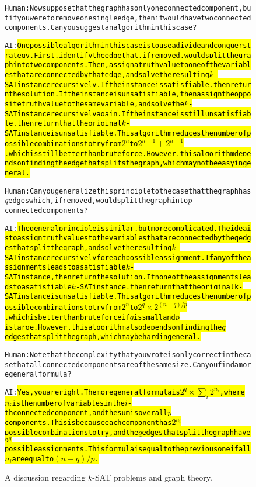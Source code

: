 \begin{figure}[H]
\begin{AIbox}{\DV}
{\begin{alltt}
Human: Now suppose that the graph has only one connected component, but if you were to remove one single edge, then it would have two connected components. Can you suggest an algorithm in this case?

AI: \hl{One possible algorithm in this case is to use a divide and conquer strategy. First, identify the edge that, if removed, would split the graph into two components. Then, assign a truth value to one of the variables that are connected by that edge, and solve the resulting $k$-SAT instance recursively. If the instance is satisfiable, then return the solution. If the instance is unsatisfiable, then assign the opposite truth value to the same variable, and solve the $k$-SAT instance recursively again. If the instance is still unsatisfiable, then return that the original $k$-SAT instance is unsatisfiable. This algorithm reduces the number of possible combinations to try from $2^n$ to $2^{n-1} + 2^{n-1}$, which is still better than brute force. However, this algorithm depends on finding the edge that splits the graph, which may not be easy in general.}

Human: Can you generalize this principle to the case that the graph has $q$ edges which, if removed, would split the graph into $p$ connected components?

AI: \hl{The general principle is similar, but more complicated. The idea is to assign truth values to the variables that are connected by the q edges that split the graph, and solve the resulting $k$-SAT instance recursively for each possible assignment. If any of the assignments leads to a satisfiable $k$-SAT instance, then return the solution. If none of the assignments leads to a satisfiable $k$-SAT instance, then return that the original k-SAT instance is unsatisfiable. This algorithm reduces the number of possible combinations to try from $2^n$ to $2^q \times 2^{(n-q)/p}$, which is better than brute force if $q$ is small and $p$ is large. However, this algorithm also depends on finding the $q$ edges that split the graph, which may be hard in general.}

Human: Note that the complexity that you wrote is only correct in the case that all connected components are of the same size. Can you find a more general formula?

AI: \hl{Yes, you are right. The more general formula is $2^q \times \sum_i 2^{n_i}$, where $n_i$ is the number of variables in the $i$-th connected component, and the sum is over all $p$ components. This is because each component has $2^{n_i}$ possible combinations to try, and the $q$ edges that split the graph have $2^q$ possible assignments. This formula is equal to the previous one if all $n_i$ are equal to $(n-q)/p$.}
\end{alltt}
}
\end{AIbox}
\caption{A discussion regarding $k$-SAT problems and graph theory.}
\end{figure}
